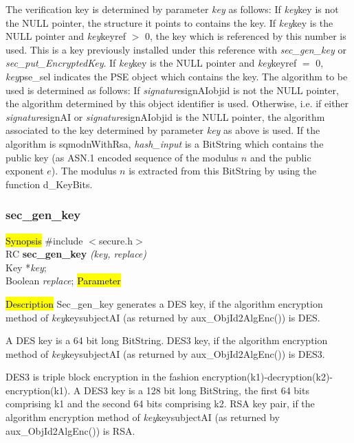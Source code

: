 The verification key is determined by parameter {\em key} as follows:
\be
\m If {\em key}\pf key is not the NULL pointer, the structure it points to
   contains the key.
\m If {\em key}\pf key is the NULL pointer and {\em key}\pf keyref $>$ 0,
   the key which is referenced by this number is used. This is a key
   previously installed under this reference with {\em sec\_gen\_key} or 
   {\em sec\_put\_EncryptedKey}.
\m If {\em key}\pf key is the NULL pointer and {\em key}\pf keyref $=$ 0,
   {\em key}\pf pse\_sel indicates the PSE object which contains the key.
\ee
The algorithm to be used is determined as follows:
\be
\m If {\em signature}\pf signAI\pf objid is not the NULL pointer, the algorithm
   determined by this object identifier is used.
\m Otherwise, i.e. if either {\em signature}\pf signAI or {\em signature}\pf signAI\pf objid 
   is the NULL pointer, the algorithm
   associated to the key determined by parameter {\em key} as above is used.
\ee
If the algorithm is sqmodnWithRsa, {\em hash\_input} is a BitString which contains the 
public key (as ASN.1 encoded sequence of the modulus $n$ and the public
exponent $e$). The modulus $n$ is extracted from this BitString by using the function
d\_KeyBits.

\subsubsection{sec\_gen\_key}
\label{sec_gen_key}
\hl{Synopsis}
\#include $<$secure.h$>$ \\ [0.5cm]
RC {\bf sec\_gen\_key} {\em (key, replace)} \\
Key *{\em key}; \\
Boolean {\em replace};
\hl{Parameter}


\hl{Description}
Sec\_gen\_key generates a
\bi
\m  DES key, 
    if the algorithm encryption method 
    of {\em key}\pf key\pf subjectAI (as returned by aux\_ObjId2AlgEnc()) is DES. 

    A DES key is a 64 bit long BitString.
\m  DES3 key, 
    if the algorithm encryption method 
    of {\em key}\pf key\pf subjectAI (as returned by aux\_ObjId2AlgEnc()) is DES3. 

    DES3 is triple block encryption in the fashion encryption(k1)-decryption(k2)-encryption(k1).
    A DES3 key is a 128 bit long BitString, the first 64 bits comprising k1 and the
    second 64 bits comprising k2.
\m  RSA key pair, 
    if the algorithm encryption method 
    of {\em key}\pf key\pf subjectAI (as returned by aux\_ObjId2AlgEnc()) is RSA. 

